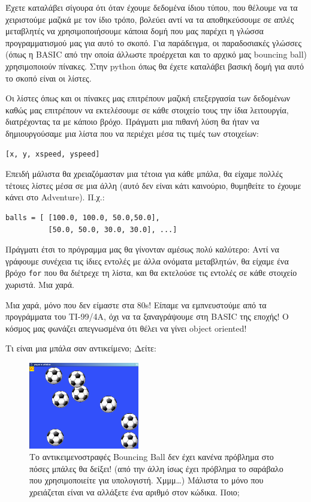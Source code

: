 Έχετε καταλάβει σίγουρα ότι όταν έχουμε δεδομένα ίδιου τύπου, που θέλουμε
να τα χειριστούμε μαζικά με τον ίδιο τρόπο, βολεύει αντί να τα
αποθηκεύσουμε σε απλές μεταβλητές να χρησιμοποιήσουμε κάποια δομή που μας
παρέχει η γλώσσα προγραμματισμού μας για αυτό το σκοπό. Για παράδειγμα,
οι παραδοσιακές γλώσσες (όπως η BASIC από την οποία άλλωστε προέρχεται
και το αρχικό μας bouncing ball) χρησιμοποιούν πίνακες. Στην python όπως
θα έχετε καταλάβει βασική δομή για αυτό το σκοπό είναι οι λίστες.

Οι λίστες όπως και οι πίνακες μας επιτρέπουν μαζική επεξεργασία των
δεδομένων καθώς μας επιτρέπουν να εκτελέσουμε σε κάθε στοιχείο τους την
ίδια λειτουργία, διατρέχοντας τα με κάποιο βρόχο. Πράγματι μια πιθανή λύση θα ήταν να δημιουργούσαμε μια λίστα που να περιέχει μέσα τις
τιμές των στοιχείων:

\begin{verbatim}
[x, y, xspeed, yspeed]
\end{verbatim}

Επειδή μάλιστα θα χρειαζόμασταν μια τέτοια για κάθε μπάλα, θα είχαμε
πολλές τέτοιες λίστες μέσα σε μια άλλη (αυτό δεν είναι κάτι καινούριο,
θυμηθείτε το έχουμε κάνει στο Adventure). Π.χ.:

\begin{verbatim}
balls = [ [100.0, 100.0, 50.0,50.0],
          [50.0, 50.0, 30.0, 30.0], ...]
\end{verbatim}

Πράγματι έτσι το πρόγραμμα μας θα γίνονταν αμέσως πολύ καλύτερο: Αντί να
γράφουμε συνέχεια τις ίδιες εντολές με άλλα ονόματα μεταβλητών, θα είχαμε
ένα βρόχο {\tt for} που θα διέτρεχε τη λίστα, και θα εκτελούσε τις εντολές σε
κάθε στοιχείο χωριστά. Μια χαρά.

Μια χαρά, μόνο που δεν είμαστε στα 80s! Είπαμε να εμπνευστούμε από τα
προγράμματα του TI-99/4A, όχι να τα ξαναγράψουμε στη BASIC της εποχής!
Ο κόσμος μας φωνάζει απεγνωσμένα ότι θέλει να γίνει object oriented!

Τι είναι μια μπάλα σαν αντικείμενο; Δείτε:
\begin{figure}
  \centering
  \includegraphics[width=0.43\textwidth]{images/chapter5/bouncing-ball-oop}
  \caption[Αντικειμενοστραφές Bouncing Ball]{Το αντικειμενοστραφές Bouncing
Ball δεν έχει κανένα πρόβλημα στο πόσες μπάλες θα δείξει! (από την άλλη ίσως
έχει πρόβλημα το σαράβαλο που χρησιμοποιείτε για υπολογιστή. Χμμμ\ldots{}) Μάλιστα το μόνο που χρειάζεται είναι να αλλάξετε ένα αριθμό στον κώδικα. Ποιο;}
  \label{5-1}
\end{figure}

